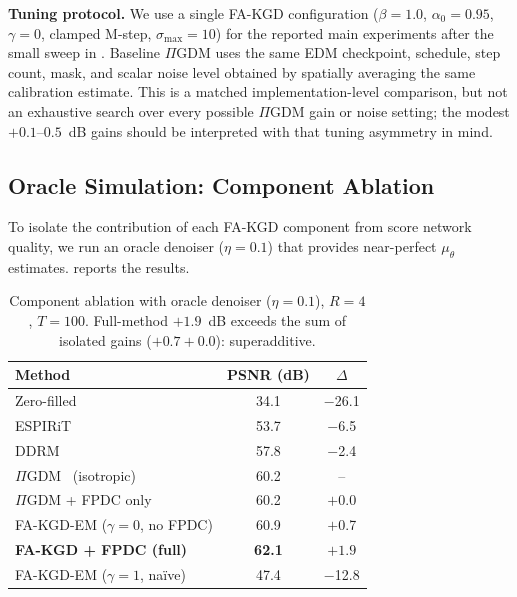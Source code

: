 \documentclass[10pt,twocolumn,letterpaper]{article}
\newcommand{\muth}{\mu_\theta}
\newcommand{\PIGDM}{$\Pi$GDM}
\begin{document}
\textbf{Tuning protocol.} We use a single FA-KGD configuration
($\beta{=}1.0$, $\alpha_0{=}0.95$, $\gamma{=}0$, clamped M-step,
$\sigma_{\max}{=}10$) for the reported main experiments after the small sweep
in . Baseline $\Pi$GDM uses the same EDM checkpoint, schedule,
step count, mask, and scalar noise level obtained by spatially averaging the
same calibration estimate. This is a matched implementation-level comparison,
but not an exhaustive search over every possible $\Pi$GDM gain or noise setting;
the modest $+0.1$--$0.5$~dB gains should be interpreted with that tuning
asymmetry in mind.

\subsection{Oracle Simulation: Component Ablation}
\label{sec:ablation}

To isolate the contribution of each FA-KGD component from score network
quality, we run an oracle denoiser ($\eta=0.1$) that provides near-perfect
$\muth$ estimates.  reports the results.

\begin{table}[H]
\centering
\caption{Component ablation with oracle denoiser ($\eta{=}0.1$), $R{=}4$,
$T{=}100$. Full-method $+1.9$~dB exceeds the sum of isolated gains
($+0.7+0.0$): superadditive.}
\label{tab:ablation}
\scriptsize
\setlength{\tabcolsep}{3pt}
\begin{tabular}{lcc}
\toprule
\textbf{Method} & \textbf{PSNR (dB)} & \textbf{$\Delta$} \\
\midrule
Zero-filled & 34.1 & $-$26.1 \\
ESPIRiT~\cite{uecker2014espirit} & 53.7 & $-$6.5 \\
DDRM~\cite{kawar2022ddrm} & 57.8 & $-$2.4 \\
\PIGDM{}~\cite{song2023pigdm} (isotropic) & 60.2 & -- \\
\midrule
\PIGDM{} + FPDC only & 60.2 & $+$0.0 \\
FA-KGD-EM ($\gamma{=}0$, no FPDC) & 60.9 & $+$0.7 \\
\textbf{FA-KGD + FPDC (full)} & \textbf{62.1} & $\mathbf{+1.9}$ \\
\midrule
FA-KGD-EM ($\gamma{=}1$, na\"{i}ve) & 47.4 & $-$12.8 \\
\bottomrule
\end{tabular}
\end{table}
\end{document}
